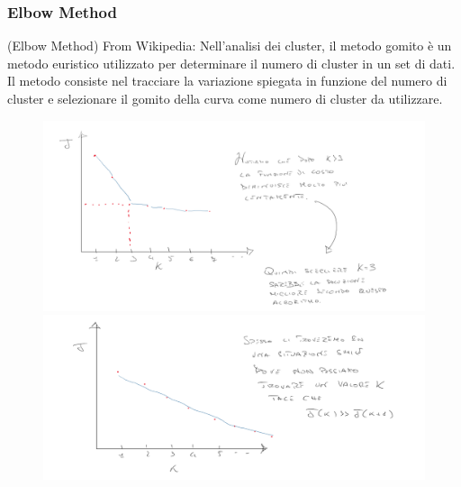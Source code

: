 \subsubsection{Elbow Method}
\begin{definizione}(Elbow Method)
  From Wikipedia: Nell'analisi dei cluster, il metodo gomito è un metodo euristico utilizzato per determinare il numero di cluster in un set di dati. Il metodo consiste nel tracciare la variazione spiegata in funzione del numero di cluster e selezionare il gomito della curva come numero di cluster da utilizzare.
\end{definizione}
\begin{figure}[!htb]
   \begin{minipage}{0.48\textwidth}
     \centering
     \includegraphics[width=1\linewidth]{img/kmeans12.PNG}
   \end{minipage}\hfill
   \begin{minipage}{0.48\textwidth}
     \centering
     \includegraphics[width=1\linewidth]{img/kmeans13.PNG}
   \end{minipage}
\end{figure}
